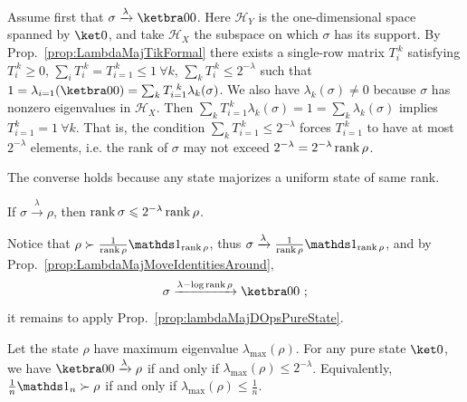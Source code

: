 \documentclass[11pt,a4paper]{article}
\def\Hs{\mathscr{H}}%
\newenvironment{myproof}[1][\proofname]{%
  \color{prooftextcolor} \footnotesize \proof[\itshape #1]\hspace*{1.2mm}%
}{\endproof}
\newcommand{\lambdamaj}[1]{\xrightarrow{#1}}
\begin{document}
\begin{myproof}[Proof of Prop.~\ref{prop:lambdaMajDOpsPureState}]
  Assume first that  $\sigma\lambdamaj\lambda\ketbra00$. Here $\Hs_Y$ is the one-dimensional space
  spanned by $\ket0$, and take $\Hs_X$ the subspace on which $\sigma$ has its support. By
  Prop.~\ref{prop:LambdaMajTikFormal} there exists a single-row matrix
  $T_i^{~k}$ satisfying $T_i^{~k}\geqslant 0$, $\sum_i T_i^{~k} = T_{i=1}^{~k} \leqslant 1~\forall k$,
  $\sum_k T_i^{~k} \leqslant 2^{-\lambda}$ such that
  $1 = \lambda_{i=1}(\ketbra00) = \sum_k T_{i=1}^{~k} \lambda_k(\sigma)$. We also have $\lambda_k(\sigma)\neq 0$
  because $\sigma$ has nonzero eigenvalues in $\Hs_X$. Then
  $\sum_k T_{i=1}^{~k} \lambda_k(\sigma) = 1 = \sum_k\lambda_k(\sigma)$ implies $T_{i=1}^k = 1~\forall k$.
  That is, the condition $\sum_k T_{i=1}^{~k} \leqslant 2^{-\lambda}$ forces $T_{i=1}^{~k}$ to have at most
  $2^{-\lambda}$ elements, i.e. the rank of $\sigma$ may not exceed $2^{-\lambda}=2^{-\lambda} \operatorname{rank}\rho$.

  The converse holds because any state majorizes a uniform state of same rank.
\end{myproof}

\begin{prop}
  \label{prop:lambdaMajDOpsConditionRanks}
  If $\sigma\lambdamaj\lambda\rho$, then $\operatorname{rank}\sigma\leqslant 2^{-\lambda}\operatorname{rank}\rho$. 
\end{prop}

\begin{myproof}[Proof of Prop.~\ref{prop:lambdaMajDOpsConditionRanks}]
  Notice that $\rho\succ\frac1{\rank\rho}\Ident_{\rank\rho}$, thus
  $\sigma\lambdamaj\lambda\frac1{\rank\rho}\Ident_{\rank\rho}$, and by
  Prop.~\ref{prop:LambdaMajMoveIdentitiesAround},
  \begin{equation*}
    \sigma\lambdamaj{\lambda-\log\rank\rho} \ketbra00\ ;
  \end{equation*}
  it remains to apply Prop.~\ref{prop:lambdaMajDOpsPureState}.
\end{myproof}


\begin{prop}
  \label{prop:LambdaMajorizedDOpsByPureState}
  Let the state $\rho$ have maximum eigenvalue $\lambda_\mathrm{max}(\rho)$.
  For any pure state $\ket0$, we have $\ketbra00 \lambdamaj\lambda \rho$ if and only if
  $\lambda_\mathrm{max}(\rho) \leqslant 2^{-\lambda}$. Equivalently, $\frac1n\Ident_n\succ\rho$ if and
  only if $\lambda_\mathrm{max}(\rho) \leqslant \frac1n$.
\end{prop}
\end{document}
